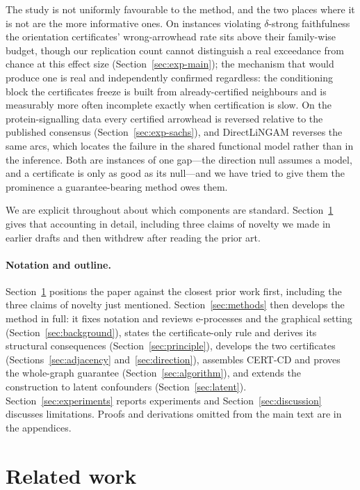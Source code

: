 \documentclass[pdflatex,sn-apa]{sn-jnl}
\theoremstyle{thmstyleone}%
\theoremstyle{thmstyletwo}%
\theoremstyle{thmstylethree}%
\begin{document}
The study is not uniformly favourable to the method, and the two places where
it is not are the more informative ones. On instances violating
$\delta$-strong faithfulness the orientation certificates' wrong-arrowhead
rate sits above their family-wise budget, though our replication count cannot
distinguish a real exceedance from chance at this effect size
(Section~\ref{sec:exp-main}); the mechanism that would produce one is real
and independently confirmed regardless: the conditioning block the
certificates freeze is built from already-certified neighbours and is
measurably more often incomplete exactly when certification is slow. On the
protein-signalling data
every certified arrowhead is reversed relative to the published consensus
(Section~\ref{sec:exp-sachs}), and DirectLiNGAM reverses the same arcs, which
locates the failure in the shared functional model rather than in the
inference. Both are instances of one gap---the direction null assumes a model,
and a certificate is only as good as its null---and we have tried to give them
the prominence a guarantee-bearing method owes them.

We are explicit throughout about which components are standard.
Section~\ref{sec:related} gives that accounting in detail, including three
claims of novelty we made in earlier drafts and then withdrew after reading
the prior art.

\paragraph{Notation and outline.} Section~\ref{sec:related} positions the
paper against the closest prior work first, including the three claims of
novelty just mentioned. Section~\ref{sec:methods} then develops the method in
full: it fixes notation and reviews e-processes and the graphical setting
(Section~\ref{sec:background}), states the certificate-only rule and derives
its structural consequences (Section~\ref{sec:principle}), develops the two
certificates (Sections~\ref{sec:adjacency} and~\ref{sec:direction}), assembles
CERT-CD and proves the whole-graph guarantee (Section~\ref{sec:algorithm}),
and extends the construction to latent confounders
(Section~\ref{sec:latent}). Section~\ref{sec:experiments} reports experiments
and Section~\ref{sec:discussion} discusses limitations. Proofs and
derivations omitted from the main text are in the appendices.

\section{Related work}\label{sec:related}
\end{document}
